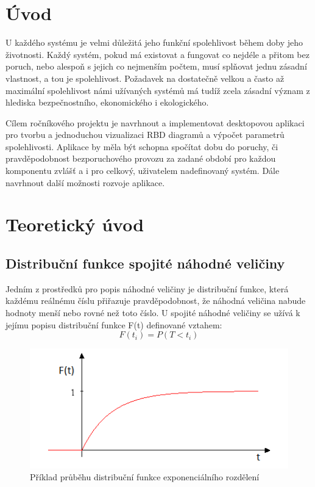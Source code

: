 \documentclass[FM,RP]{tulthesis}
\begin{document}
\chapter*{Úvod}
    U každého systému je velmi důležitá jeho funkční spolehlivost během doby jeho životnosti. 
    Každý systém, pokud má existovat a fungovat co nejdéle a přitom bez poruch,
    nebo alespoň s jejich co nejmenším počtem, musí splňovat jednu zásadní vlastnost, a tou je spolehlivost. 
    Požadavek na dostatečně velkou a často až maximální spolehlivost námi užívaných systémů má tudíž zcela zásadní význam z hlediska bezpečnostního, ekonomického i
    ekologického. 

    Cílem ročníkového projektu je navrhnout a implementovat desktopovou aplikaci pro tvorbu a jednoduchou vizualizaci RBD diagramů a výpočet parametrů spolehlivosti.
    Aplikace by měla být schopna spočítat dobu do poruchy, či pravděpodobnost bezporuchového provozu za zadané období pro každou komponentu zvlášť a i pro celkový, uživatelem
    nadefinovaný systém. Dále navrhnout další možnosti rozvoje aplikace.

\chapter{Teoretický úvod}
        
    \section*{Distribuční funkce spojité náhodné veličiny}
        Jedním z prostředků pro popis náhodné veličiny je distribuční funkce, která každému
        reálnému číslu přiřazuje pravděpodobnost, že náhodná veličina nabude hodnoty menší nebo
        rovné než toto číslo.\cite{6}
        U spojité náhodné veličiny se užívá k jejímu popisu distribuční funkce F(t) definované vztahem: 
        $$ F(t_{i}) = P(T<t_{i}) $$
            \begin{figure}[h]
                \centering
                \includegraphics[scale=0.75]{pic/distrib.png}
                \caption{Příklad průběhu distribuční funkce exponenciálního rozdělení} 
            \end{figure}
\end{document}
